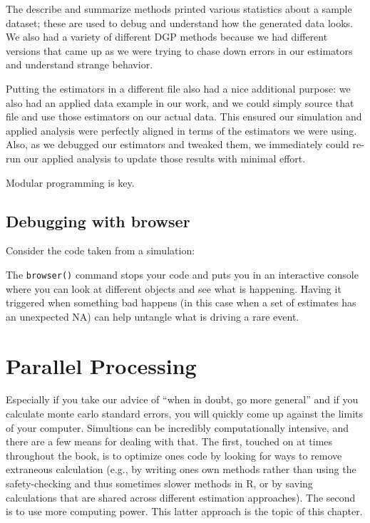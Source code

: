 \documentclass[
]{book}
\newenvironment{Shaded}{\begin{snugshade}}{\end{snugshade}}
\newcommand{\ControlFlowTok}[1]{\textcolor[rgb]{0.13,0.29,0.53}{\textbf{#1}}}
\newcommand{\FunctionTok}[1]{\textcolor[rgb]{0.00,0.00,0.00}{#1}}
\newcommand{\NormalTok}[1]{#1}
\newcommand{\SpecialCharTok}[1]{\textcolor[rgb]{0.00,0.00,0.00}{#1}}
\begin{document}
The describe and summarize methods printed various statistics about a sample dataset; these are used to debug and understand how the generated data looks.
We also had a variety of different DGP methods because we had different versions that came up as we were trying to chase down errors in our estimators and understand strange behavior.

Putting the estimators in a different file also had a nice additional purpose: we also had an applied data example in our work, and we could simply source that file and use those estimators on our actual data.
This ensured our simulation and applied analysis were perfectly aligned in terms of the estimators we were using.
Also, as we debugged our estimators and tweaked them, we immediately could re-run our applied analysis to update those results with minimal effort.

Modular programming is key.

\hypertarget{debugging-with-browser}{%
\section{Debugging with browser}\label{debugging-with-browser}}

Consider the code taken from a simulation:

\begin{Shaded}
\end{Shaded}

The \texttt{browser()} command stops your code and puts you in an interactive console where you can look at different objects and see what is happening.
Having it triggered when something bad happens (in this case when a set of estimates has an unexpected NA) can help untangle what is driving a rare event.

\hypertarget{parallel-processing}{%
\chapter{Parallel Processing}\label{parallel-processing}}

Especially if you take our advice of ``when in doubt, go more general'' and if you calculate monte carlo standard errors, you will quickly come up against the limits of your computer.
Simultions can be incredibly computationally intensive, and there are a few means for dealing with that.
The first, touched on at times throughout the book, is to optimize ones code by looking for ways to remove extraneous calculation (e.g., by writing ones own methods rather than using the safety-checking and thus sometimes slower methods in R, or by saving calculations that are shared across different estimation approaches).
The second is to use more computing power.
This latter approach is the topic of this chapter.
\end{document}
